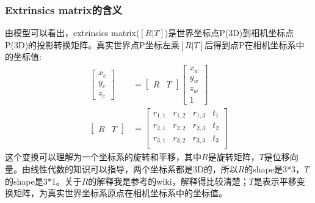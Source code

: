\documentclass[UTF8]{ctexart}
\begin{document}
\subsubsection{Extrinsics matrix的含义}
由模型可以看出，extrinsics matrix($[R|T]$)是世界坐标点P(3D)到相机坐标点P(3D)的投影转换矩阵。真实世界点P坐标左乘$[R|T]$后得到点P在相机坐标系中的坐标值:
\begin{align}
 \left[ \begin{array}{c}  x_c \\ y_c \\  z_c \end{array} \right] &=
 \left[ \begin{array}{c|c} R & T   \end{array} \right] \left[ \begin{array}{c}   x_w \\  y_w \\  z_w \\ 1 \end{array}\right]\\
 \left[ \begin{array}{c|c} R & T   \end{array} \right] &=
\left[ \begin{array}{ccc|c}
r_{1,1} & r_{1,2} & r_{1,3} & t_1 \\
r_{2,1} & r_{2,2} & r_{2,3} & t_2 \\
r_{3,1} & r_{3,2} & r_{3,3} & t_3 \\
\end{array} \right]
\end{align}
这个变换可以理解为一个坐标系的旋转和平移，其中$R$是旋转矩阵，$T$是位移向量。由线性代数的知识可以指导，两个坐标系都是3D的，所以$R$的shape是3*3，$T$的shape是3*1。关于$R$的解释我是参考的wiki\cite{wikiRotationmatrix18830}，解释得比较清楚；$T$是表示平移变换矩阵，为真实世界坐标系原点在相机坐标系中的坐标值。
\end{document}
